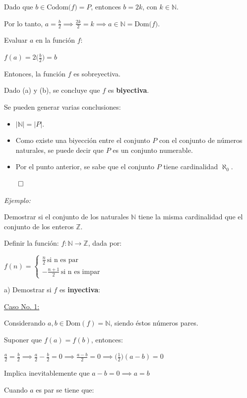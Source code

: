 \documentclass{article}
\begin{document}
Dado que $b \in \text{Codom($f$)} = P$, entonces $b = 2k$, con $k \in \mathbb{N}$.

Por lo tanto, $\displaystyle a = \frac{b}{2} \implies \frac{2k}{2} = k \implies a \in \mathbb{N} = \text{Dom($f$)}$.

Evaluar $a$ en la función $f$:

$\displaystyle f(a) = 2\Big(\frac{b}{2}\Big) = b$

Entonces, la función $f$ es sobreyectiva.

Dado (a) y (b), se concluye que $f$ es \textbf{biyectiva}.

Se pueden generar varias conclusiones:

\begin{itemize}
    \item $\left|\mathbb{N}\right| = \left|P\right|$.
    \item Como existe una biyección entre el conjunto $P$ con el conjunto de números naturales, se puede decir que $P$ es un conjunto numerable.
    \item Por el punto anterior, se sabe que el conjunto $P$ tiene cardinalidad $\aleph_0$.
\end{itemize}

$\qed$

\textit{Ejemplo:}

Demostrar si el conjunto de los naturales $\mathbb{N}$ tiene la misma cardinalidad que el conjunto de los enteros $\mathbb{Z}$.

Definir la función: $f: \mathbb{N} \to \mathbb{Z}$, dada por:

$
f(n) = 
\begin{cases}
    \frac{n}{2} \, \text{si n es par} \\
    -\frac{n + 1}{2} \, \text{si n es impar} 
\end{cases}
$

a) Demostrar si $f$ es \textbf{inyectiva}:

\underline{Caso No. 1:} 

Considerando $a, b \in \text{Dom}(f) = \mathbb{N}$, siendo éstos números pares.

Suponer que $f(a) = f(b)$, entonces:

$\displaystyle \frac{a}{2} = \frac{b}{2} \implies \frac{a}{2} - \frac{b}{2} = 0 \implies \frac{a - b}{2} = 0 \implies \Big(\frac{1}{2}\Big)(a - b) = 0$

Implica inevitablemente que $a - b = 0 \implies a = b$

Cuando $a$ es par se tiene que:
\end{document}
